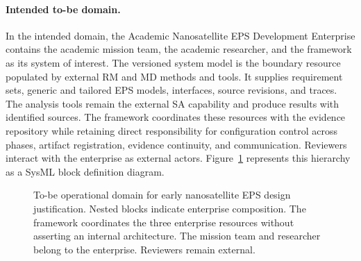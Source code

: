 \documentclass[11pt,a4paper]{article}
\begin{document}

\paragraph{Intended to-be domain.}
In the intended domain, the Academic Nanosatellite EPS Development Enterprise contains the academic mission team, the academic researcher, and the framework as its system of interest. The versioned system model is the boundary resource populated by external RM and MD methods and tools. It supplies requirement sets, generic and tailored EPS models, interfaces, source revisions, and traces. The analysis tools remain the external SA capability and produce results with identified sources. The framework coordinates these resources with the evidence repository while retaining direct responsibility for configuration control across phases, artifact registration, evidence continuity, and communication. Reviewers interact with the enterprise as external actors. Figure~\ref{fig:to-be-operational-domain} represents this hierarchy as a SysML block definition diagram.

\begin{figure}[htbp]
    \centering
    \resizebox{\linewidth}{!}{}
    \caption{To-be operational domain for early nanosatellite EPS design justification. Nested blocks indicate enterprise composition. The framework coordinates the three enterprise resources without asserting an internal architecture. The mission team and researcher belong to the enterprise. Reviewers remain external.}
    \label{fig:to-be-operational-domain}
\end{figure}
\end{document}
